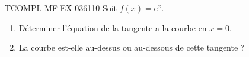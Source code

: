 \begin{exercice}{TCOMPL-MF-EX-036}{1}{10}
Soit $f(x) = \mathrm{e}^x$.
\begin{enumerate}
  \item Déterminer l'équation de la tangente a la courbe en $x = 0$.
  \item La courbe est-elle au-dessus ou au-dessous de cette tangente ?
\end{enumerate}

\end{exercice}

